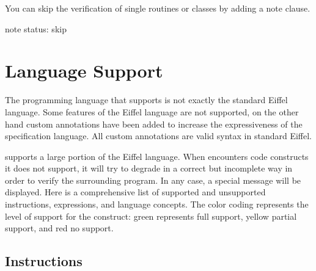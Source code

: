 You can skip the verification of single routines or classes by adding a note clause.

\begin{erunning}
note
  status: skip
\end{erunning}
  


\section{Language Support} \label{manual:lang-support}



  The programming language that \AutoProof supports is not exactly the standard Eiffel language. Some features of the Eiffel language are not supported, on the other hand custom annotations have been added to increase the expressiveness of the specification language. All custom annotations are valid syntax in standard Eiffel.


  \AutoProof supports a large portion of the Eiffel language. When \AutoProof encounters code constructs it does not support, it will try to degrade in a correct but incomplete way in order to verify the surrounding program. In any case, a special message will be displayed. Here is a comprehensive list of supported and unsupported instructions, expressions, and language concepts.
The color coding represents the level of support for the construct: \colorbox{full}{green} represents full support, \colorbox{partial}{yellow} partial support, and \colorbox{none}{red} no support.


\subsection{Instructions}

